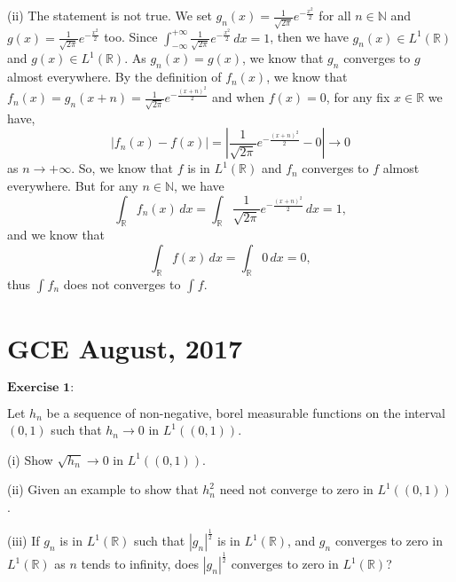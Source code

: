 \documentclass[12pt]{article}
\begin{document}
(ii) The statement is not true. We set $g_{n} (x) = \frac{1}{\sqrt{2 \pi}} e^{- \frac{x^{2}}{2}}$ for all $n \in \mathbb{N}$ and $g (x) = \frac{1}{\sqrt{2 \pi}} e^{- \frac{x^{2}}{2}}$ too. Since $\int_{- \infty}^{+ \infty} \frac{1}{\sqrt{2 \pi}} e^{- \frac{x^{2}}{2}} \, d x = 1$, then we have $g_{n} (x) \in L^{1}(\mathbb{R})$ and $g(x) \in L^{1}(\mathbb{R})$. As $g_{n} (x) = g(x)$, we know that $g_{n}$ converges to $g$ almost everywhere. By the definition of $f_{n}(x)$, we know that $f_{n}(x) = g_{n} (x + n) = \frac{1}{\sqrt{2 \pi}} e^{- \frac{(x+n)^{2}}{2}}$ and when $f(x) = 0$, for any fix $x \in \mathbb{R}$ we have,
\begin{equation*}
   |f_{n}(x) - f(x)| = |\frac{1}{\sqrt{2 \pi}} e^{- \frac{(x+n)^{2}}{2}} - 0| \to 0 
\end{equation*}
as $n \to + \infty$. So, we know that $f$ is in $L^{1}(\mathbb{R})$ and $f_{n}$ converges to $f$ almost everywhere. But for any $n \in \mathbb{N}$, we have
\begin{equation*}
   \int_{\mathbb{R}}^{} f_{n} (x) \, d x = \int_{\mathbb{R}}^{} \frac{1}{\sqrt{2 \pi}} e^{- \frac{(x+n)^{2}}{2}} \, d x = 1,
\end{equation*}
and we know that
\begin{equation*}
   \int_{\mathbb{R}}^{} f (x) \, d x = \int_{\mathbb{R}}^{} 0 \, d x = 0,
\end{equation*}
thus $\int_{}^{} f_{n}$ does not converges to $\int_{}^{} f$. 

\newpage

\section{GCE August, 2017}

$\textbf{Exercise 1:}$

Let $h_{n}$ be a sequence of non-negative, borel measurable functions on the interval $(0, 1)$ such that $h_{n} \rightarrow 0$ in $L^{1}((0, 1))$.

(i) Show $\sqrt{h_{n}} \rightarrow 0$ in $L^{1}((0, 1))$.

(ii) Given an example to show that $h_{n}^{2}$ need not converge to zero in $L^{1}((0, 1))$.

(iii) If $g_{n}$ is in $L^{1}(\mathbb{R})$ such that $|g_{n}|^{\frac{1}{2}}$ is in $L^{1}(\mathbb{R})$, and $g_{n}$ converges to zero in $L^{1}(\mathbb{R})$ as $n$ tends to infinity, does $|g_{n}|^{\frac{1}{2}}$ converges to zero in $L^{1}(\mathbb{R})$?

\vspace{8pt}
\end{document}
